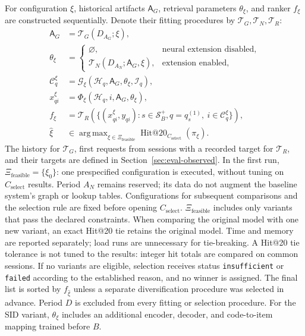 \documentclass[12pt,a4paper]{article}
\newcommand{\code}[1]{{\ttfamily\small\nolinkurl{#1}}}
\DeclareMathOperator*{\argmax}{arg\,max}
\theoremstyle{plainru}
\begin{document}
For configuration $\xi$, historical artifacts
$\mathsf A_G$, retrieval parameters $\theta_\xi$, and ranker $f_\xi$ are constructed sequentially.
Denote their fitting procedures by
$\mathcal T_G,\mathcal T_N,\mathcal T_R$:
\begin{align}
\mathsf A_G&=\mathcal T_G(D_{A_G};\xi),\\
\theta_\xi&=
\begin{cases}
\varnothing,&\text{neural extension disabled},\\
\mathcal T_N(D_{A_N};\mathsf A_G,\xi),&\text{extension enabled},
\end{cases}\\
\mathcal C_q^\xi&=\mathcal G_\xi(\mathcal H_q,\mathsf A_G,\theta_\xi,\mathcal I_q),\\
x_{qi}^\xi&=\Phi_\xi(\mathcal H_q,i,\mathsf A_G,\theta_\xi),\\
f_\xi&=\mathcal T_R(\{(x_{qi}^\xi,y_{qi}):s\in\mathcal S_B^+,
q=q_s^{(1)},\ i\in\mathcal C_q^\xi\}),\\
\widehat\xi&\in\argmax_{\xi\in\Xi_{\mathrm{feasible}}}
\operatorname{Hit@20}_{C_{\mathrm{select}}}(\pi_\xi).
\end{align}
The history for $\mathcal T_G$, first requests from sessions with a recorded
target for $\mathcal T_R$, and their targets are defined in Section~\ref{sec:eval-observed}.
In the first run, $\Xi_{\mathrm{feasible}}=\{\xi_0\}$:
one prespecified configuration is executed, without tuning
on $C_{\mathrm{select}}$ results. Period $A_N$ remains reserved;
its data do not augment the baseline system's graph or lookup tables.
Configurations for subsequent comparisons and the selection rule are fixed
before opening $C_{\mathrm{select}}$.
$\Xi_{\mathrm{feasible}}$ includes only variants that pass the declared
constraints. When comparing the original model with one new variant,
an exact Hit@20 tie retains the original model. Time and memory
are reported separately; load runs are unnecessary for tie-breaking.
A Hit@20 tie tolerance is not tuned to the results:
integer hit totals are compared on common sessions.
If no variants are eligible, selection receives status \code{insufficient}
or \code{failed} according to the established reason, and no winner is assigned.
The final list is sorted by $f_{\widehat\xi}$ unless
a separate diversification procedure was selected in advance. Period $D$ is excluded from every
fitting or selection procedure.
For the SID variant, $\theta_\xi$ includes an additional encoder,
decoder, and code-to-item mapping trained before $B$.
\end{document}
